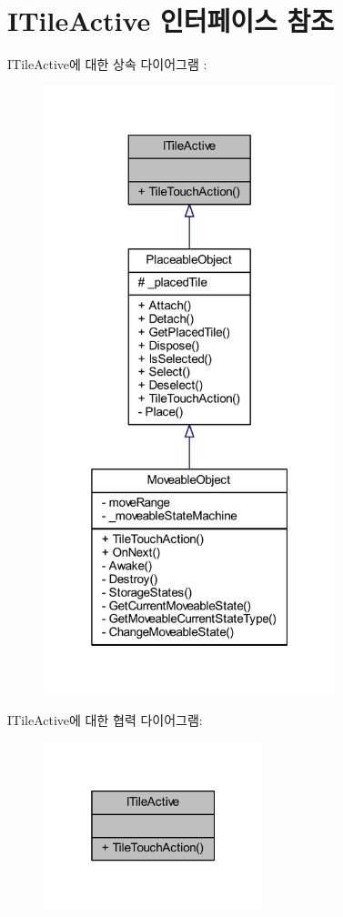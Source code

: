 \hypertarget{interface_i_tile_active}{}\section{I\+Tile\+Active 인터페이스 참조}
\label{interface_i_tile_active}


I\+Tile\+Active에 대한 상속 다이어그램 \+: \nopagebreak
\begin{figure}[H]
\begin{center}
\leavevmode
\includegraphics[width=241pt]{interface_i_tile_active__inherit__graph}
\end{center}
\end{figure}


I\+Tile\+Active에 대한 협력 다이어그램\+:\nopagebreak
\begin{figure}[H]
\begin{center}
\leavevmode
\includegraphics[width=181pt]{interface_i_tile_active__coll__graph}
\end{center}
\end{figure}
